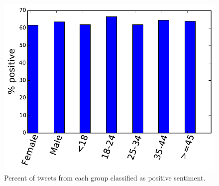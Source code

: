 \documentclass{sig-alternate}
\begin{document}
\begin{figure}[t]
\includegraphics[width=\columnwidth]{nb/pct_pos.pdf}  %
\caption{Percent of tweets from each group classified as positive sentiment.}
\centering
\label{f.pct_pos}
\end{figure}
\end{document}
